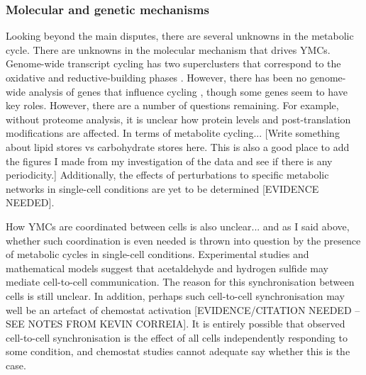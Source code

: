 \subsubsection{Molecular and genetic mechanisms}
\label{subsubsec:intro-ymc-unresolved-molecular}
Looking beyond the main disputes, there are several unknowns in the metabolic cycle.
There are unknowns in the molecular mechanism that drives YMCs.
Genome-wide transcript cycling has two superclusters that correspond to the oxidative and reductive-building phases \citep{machneYinYangYeast2012}.
However, there has been no genome-wide analysis of genes that influence cycling \citep{mellorMolecularBasisMetabolic2016}, though some genes seem to have key roles.
However, there are a number of questions remaining.
For example, without proteome analysis, it is unclear how protein levels and post-translation modifications are affected.
In terms of metabolite cycling...
[Write something about lipid stores \citep{campbellBuildingBlocksAre2020} vs carbohydrate stores \citep{ewaldYeastCyclinDependentKinase2016} here.  This is also a good place to add the figures I made from my investigation of the \citet{campbellBuildingBlocksAre2020} data and see if there is any periodicity.]
Additionally, the effects of perturbations to specific metabolic networks in single-cell conditions are yet to be determined [EVIDENCE NEEDED].

How YMCs are coordinated between cells is also unclear... and as I said above, whether such coordination is even needed is thrown into question by the presence of metabolic cycles in single-cell conditions.
Experimental studies \citep{murrayRegulationYeastOscillatory2007} and mathematical models
\citep{krishnaMinimalPushPull2018} suggest that acetaldehyde and hydrogen sulfide may mediate cell-to-cell communication.
The reason for this synchronisation between cells is still unclear. %
In addition, perhaps such cell-to-cell synchronisation may well be an artefact of chemostat activation [EVIDENCE/CITATION NEEDED -- SEE NOTES FROM KEVIN CORREIA].
It is entirely possible that observed cell-to-cell synchronisation is the effect of all cells independently responding to some condition, and chemostat studies cannot adequate say whether this is the case.

